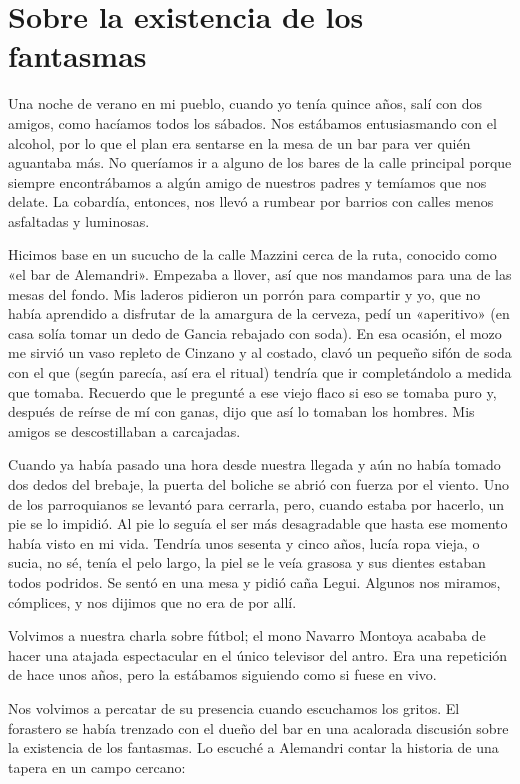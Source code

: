\documentclass[11pt,twoside,openright]{book}
\begin{document}
\chapter*{Sobre la existencia de los fantasmas}  
 Una noche de verano en mi pueblo, cuando yo tenía quince años, salí con dos amigos,
 como hacíamos todos los sábados. Nos estábamos entusiasmando
 con el alcohol, por lo que el plan era sentarse en la mesa de un bar para ver
 quién aguantaba más. No queríamos ir a alguno de los bares de la calle
 principal porque siempre encontrábamos a algún amigo de nuestros padres
 y temíamos que nos delate. La cobardía, entonces, nos llevó a rumbear
 por barrios con calles menos asfaltadas y luminosas.
 
 Hicimos base en un sucucho de la calle Mazzini cerca de la ruta, conocido
 como «el bar de Alemandri». Empezaba a llover, así que nos mandamos para
 una de las mesas del fondo. Mis laderos pidieron un porrón para
 compartir y yo, que no había aprendido a disfrutar de la amargura de la
 cerveza, pedí un «aperitivo» (en casa solía tomar un dedo de Gancia
 rebajado con soda). En esa ocasión, el mozo me sirvió un vaso repleto
 de Cinzano y al costado, clavó un pequeño sifón de soda con el que
 (según parecía, así era el ritual) tendría que ir completándolo a medida
 que tomaba. Recuerdo que le pregunté a ese viejo flaco si eso se tomaba
 puro y, después de reírse de mí con ganas, dijo que así lo tomaban los
 hombres. Mis amigos se descostillaban a carcajadas.
 
 Cuando ya había pasado una hora desde nuestra llegada y aún no había 
 tomado dos dedos del brebaje, la puerta del boliche se abrió con fuerza 
 por el viento.
 Uno de los parroquianos se levantó para cerrarla, pero, cuando estaba por
 hacerlo, un pie se lo impidió. Al pie lo seguía el ser más desagradable
 que hasta ese momento había visto en mi vida. Tendría unos sesenta y cinco años,
 lucía ropa vieja, o sucia, no sé, tenía el pelo largo, la piel se le veía
 grasosa y sus dientes estaban todos podridos. Se sentó en una mesa y pidió
 caña Legui. Algunos nos miramos, cómplices, y nos dijimos que no era de por allí.
 
 Volvimos a nuestra charla sobre fútbol; el mono Navarro Montoya acababa
 de hacer una atajada espectacular en el único televisor del antro. Era
 una repetición de hace unos años, pero la estábamos siguiendo como si
 fuese en vivo.
 
 Nos volvimos a percatar de su presencia cuando escuchamos los gritos. El
 forastero se había trenzado con el dueño del bar en una acalorada discusión
 sobre la existencia de los fantasmas. Lo escuché a Alemandri contar la
 historia de una tapera en un campo cercano: 
 
\end{document}
